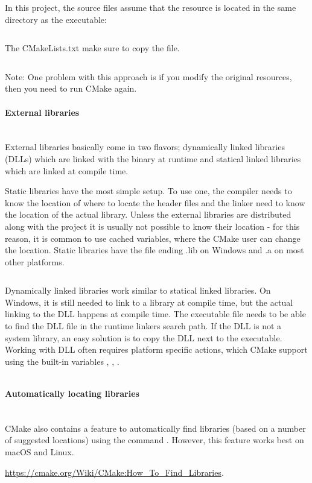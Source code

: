 \documentclass[11pt,letter,landscape]{scrartcl} %
\newcommand{\sectiontitle}[1]{\paragraph{#1} \ \\} %
\begin{document}
\begin{multicols}{2}
In this project, the source files assume that the resource is located in the same directory as the executable:

\inputminted{cpp}{examples/example7/someexe/main.cpp}

The CMakeLists.txt make sure to copy the file.

\inputminted{cmake}{examples/example7/CMakeLists.txt}

Note: One problem with this approach is if you modify the original resources, then you need to run CMake again.

\sectiontitle{External libraries}

External libraries basically come in two flavors; dynamically linked libraries (DLLs) which are linked with the binary at runtime and statical linked libraries which are linked at compile time.

Static libraries have the most simple setup. To use one, the compiler needs to know the location of where to locate the header files and the linker need to know the location of the actual library. Unless the external libraries are distributed along with the project it is usually not possible to know their location - for this reason, it is common to use cached variables, where the CMake user can change the location. Static libraries have the file ending .lib on Windows and .a on most other platforms.

\inputminted{cmake}{examples/example8/CMakeLists.txt}

Dynamically linked libraries work similar to statical linked libraries. On Windows, it is still needed to link to a library at compile time, but the actual linking to the DLL happens at compile time. The executable file needs to be able to find the DLL file in the runtime linkers search path. If the DLL is not a system library, an easy solution is to copy the DLL next to the executable. Working with DLL often requires platform specific actions, which CMake support using the built-in variables , , .

\inputminted{cmake}{examples/example9/CMakeLists.txt}

\sectiontitle{Automatically locating libraries}

CMake also contains a feature to automatically find libraries (based on a number of suggested locations) using the command . However, this feature works best on macOS and Linux.

\url{https://cmake.org/Wiki/CMake:How_To_Find_Libraries}.


\end{multicols}
\end{document}
